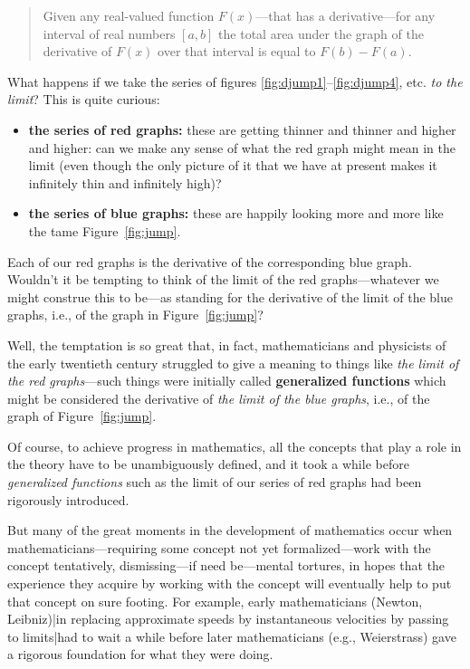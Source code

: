 \documentclass[openany]{book}
\theoremstyle{plain}
\theoremstyle{definition}
\begin{document}
\begin{quote} Given any real-valued function $F(x)$---that has a
  derivative---for any interval of real numbers $[a,b]$ the total area
  under the graph of the derivative of $F(x)$ over that interval is
  equal to $F(b)-F(a)$.
  \end{quote}  
    What happens if we take the series of figures \ref{fig:djump1}--\ref{fig:djump4}, etc. 
    {\it to the limit}?  This is quite curious: 
  
  \begin{itemize}
  \item {\bf the series of red graphs:} these are getting thinner and
    thinner and higher and higher: can we make any sense of what the
    red graph might mean in the limit (even though the only picture of
    it that we have at present makes it infinitely thin and infinitely
    high)?
  
  \item {\bf the series of blue graphs:} these are happily looking
    more and more like the tame Figure~\ref{fig:jump}.
   \end{itemize} 
  
   Each of our red graphs is the derivative of the corresponding blue
   graph. Wouldn't it be tempting to think of the limit of the red
   graphs---whatever we might construe this to be---as standing for
   the derivative of the limit of the blue graphs, i.e., of the graph
   in Figure~\ref{fig:jump}?
  
   Well, the temptation is so great that, in fact, mathematicians and
   physicists of the early twentieth century struggled to give a
   meaning to things like {\it the limit of the red graphs}---such
   things were initially called {\bf generalized functions} which
   might be considered the derivative of {\it the limit of the blue
     graphs}, i.e., of the graph of Figure~\ref{fig:jump}.
  
  
   Of course, to achieve progress in mathematics, all the concepts
   that play a role in the theory have to be unambiguously defined,
   and it took a while before {\it generalized functions} such as the
   limit of our series of red graphs had been rigorously introduced.
  
   But many of the great moments in the development of mathematics
   occur when mathematicians---requiring some concept not yet
   formalized---work with the concept tentatively, dismissing---if
   need be---mental tortures, in hopes that the experience they
   acquire by working with the concept will eventually help to put
   that concept on sure footing. For example, early mathematicians
   (Newton, Leibniz)|in replacing approximate speeds by instantaneous
   velocities by passing to limits|had to wait a while before later
   mathematicians (e.g., Weierstrass) gave a rigorous foundation for
   what they were doing.
   
\end{document}
